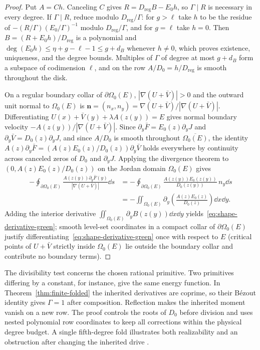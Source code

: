 \begin{proof}
Put $A=C h$. Canceling $C$ gives $R=D_{\mathrm{reg}} B-E_0 h$, so $\Gamma\mid R$ is necessary in every degree. If $\Gamma\mid R$, reduce modulo $D_{\mathrm{reg}}/\Gamma$: for $g>\ell$ take $h$ to be the residue of $-(R/\Gamma)(E_0/\Gamma)^{-1}$ modulo $D_{\mathrm{reg}}/\Gamma$, and for $g=\ell$ take $h=0$. Then $B=(R+E_0h)/D_{\mathrm{reg}}$ is a polynomial and $\deg(E_0h)\le\eta+g-\ell-1\le g+d_B$ whenever $h\ne0$, which proves existence, uniqueness, and the degree bounds. Multiples of $\Gamma$ of degree at most $g+d_B$ form a subspace of codimension $\ell$, and on the row $A/D_0=h/D_{\mathrm{reg}}$ is smooth throughout the disk.

On a regular boundary collar of $\partial\Omega_0(E)$, $|\nabla(U+\bar{V})|>0$ and the outward unit normal to $\Omega_0(E)$ is $\mathbf{n}=(n_x,n_y)=\nabla(U+\bar{V})/|\nabla(U+\bar{V})|$. Differentiating $U(x)+\bar{V}(y)+\lambda A(z(y))=E$ gives normal boundary velocity $-A(z(y))/|\nabla(U+\bar{V})|$. Since $\partial_y\bar{F}=E_0(z)\partial_y J$ and $\partial_y\bar{V}=D_0(z)\partial_y J$, and since $A/D_0$ is smooth throughout $\overline{\Omega_0(E)}$, the identity $A(z)\partial_y\bar{F}=(A(z)E_0(z)/D_0(z))\partial_y\bar{V}$ holds everywhere by continuity across canceled zeros of $D_0$ and $\partial_y J$. Applying the divergence theorem to $(0,A(z)E_0(z)/D_0(z))$ on the Jordan domain $\Omega_0(E)$ gives
\begin{align*}
  -\oint_{\partial\Omega_0(E)} \frac{A(z(y))\partial_y\bar{F}(y)}{|\nabla(U+\bar{V})|}\dd s
  &= -\oint_{\partial\Omega_0(E)} \frac{A(z(y))E_0(z(y))}{D_0(z(y))}\,n_y\dd s \\
  &= -\iint_{\Omega_0(E)} \partial_y\left(\frac{A(z)E_0(z)}{D_0(z)}\right)\dd x\dd y.
\end{align*}
Adding the interior derivative $\iint_{\Omega_0(E)}\partial_y B(z(y))\dd x\dd y$ yields~\eqref{eq:shape-derivative-green}; smooth level-set coordinates in a compact collar of $\partial\Omega_0(E)$ justify differentiating~\eqref{eq:shape-derivative-green} once with respect to $E$ (critical points of $U+\bar{V}$ strictly inside $\Omega_0(E)$ lie outside the boundary collar and contribute no boundary terms).
\end{proof}

The divisibility test concerns the chosen rational primitive. Two primitives differing by a constant, for instance, give the same energy function. In Theorem~\ref{thm:finite-folded} the inherited derivatives are coprime, so their B\'ezout identity gives \(\Gamma=1\) after composition. Reflection makes the inherited moment vanish on a new row. The proof controls the roots of \(D_0\) before division and uses nested polynomial row coordinates to keep all corrections within the physical degree budget. A single fifth-degree fold illustrates both realizability and an obstruction after changing the inherited drive \cite[Proposition~]{LuElectronic}.

